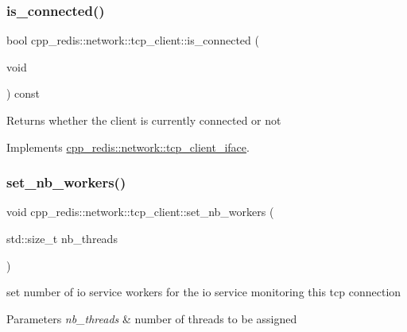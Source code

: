 \subsubsection{\texorpdfstring{is\+\_\+connected()}{is\_connected()}}
{\footnotesize\ttfamily bool cpp\+\_\+redis\+::network\+::tcp\+\_\+client\+::is\+\_\+connected (\begin{DoxyParamCaption}\item[{void}]{ }\end{DoxyParamCaption}) const\hspace{0.3cm}{\ttfamily [virtual]}}

\begin{DoxyReturn}{Returns}
whether the client is currently connected or not 
\end{DoxyReturn}


Implements \hyperlink{classcpp__redis_1_1network_1_1tcp__client__iface_a41ad0b43e3ab172828a3d2ce55d23893}{cpp\+\_\+redis\+::network\+::tcp\+\_\+client\+\_\+iface}.

\mbox{\label{classcpp__redis_1_1network_1_1tcp__client_aa56fc49540d67c5c05b3dda3aaff8a0f}} 
\subsubsection{\texorpdfstring{set\+\_\+nb\+\_\+workers()}{set\_nb\_workers()}}
{\footnotesize\ttfamily void cpp\+\_\+redis\+::network\+::tcp\+\_\+client\+::set\+\_\+nb\+\_\+workers (\begin{DoxyParamCaption}\item[{std\+::size\+\_\+t}]{nb\+\_\+threads }\end{DoxyParamCaption})}

set number of io service workers for the io service monitoring this tcp connection


\begin{DoxyParams}{Parameters}
{\em nb\+\_\+threads} & number of threads to be assigned \\
\hline
\end{DoxyParams}
\mbox{\label{classcpp__redis_1_1network_1_1tcp__client_a24ccdf6dc467aac13cb832a395adb38d}} 
